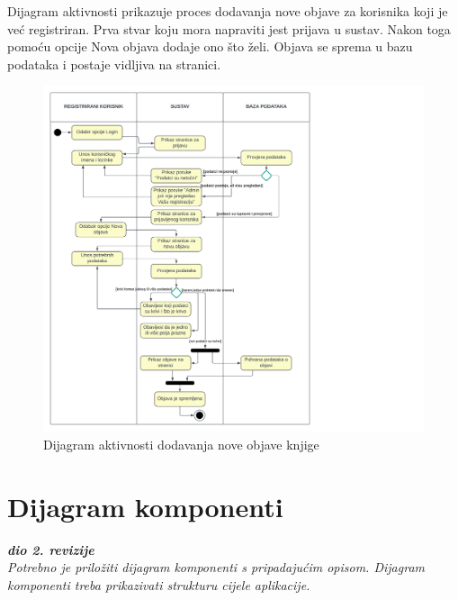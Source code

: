 			\raggedright{Dijagram aktivnosti prikazuje proces dodavanja nove objave za korisnika koji je već registriran. Prva stvar koju mora napraviti jest prijava u sustav. Nakon toga pomoću opcije Nova objava dodaje ono što želi. Objava se sprema u bazu podataka i postaje vidljiva na stranici.}\\
			
			\begin{figure}[h]
				\centering
				\includegraphics[width = \textwidth]{slike/dijagram_akt.PNG}
				\caption{Dijagram aktivnosti dodavanja nove objave knjige}
				\label{fig:enter-label}
			\end{figure}
			\eject
			
		\section{Dijagram komponenti}
		
			\textbf{\textit{dio 2. revizije}}\\
		
			 \textit{Potrebno je priložiti dijagram komponenti s pripadajućim opisom. Dijagram komponenti treba prikazivati strukturu cijele aplikacije.}